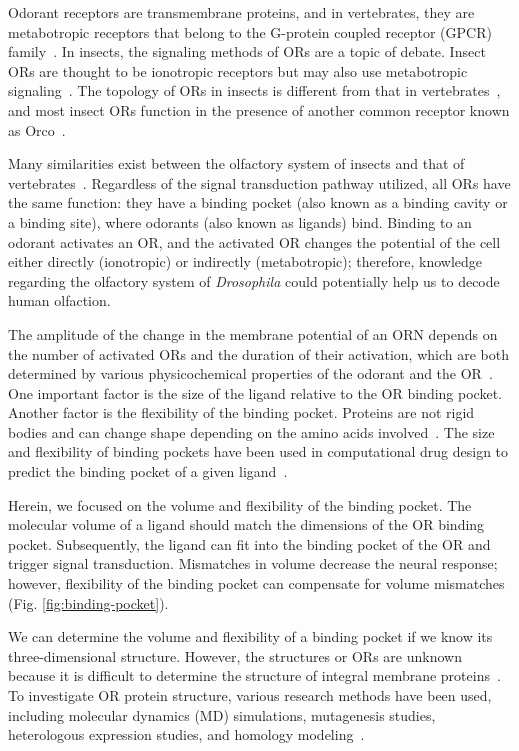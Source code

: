 \documentclass[fleqn,11pt]{wlscirep}
\begin{document}
Odorant receptors are transmembrane proteins, and 
in vertebrates, they are metabotropic receptors 
that belong to the G-protein coupled receptor (GPCR) family~\cite{Buck1991,niimura2009evolutionary}. 
In insects, the signaling methods of ORs are a topic of debate. 
Insect ORs are thought to be ionotropic receptors but may also use metabotropic signaling~\cite{Sato2008,Wicher2008,Nagel2011,Rong2011,yao2010}.
The topology of ORs in insects is different from that in vertebrates~\cite{Benton2006,Smart2008},
and most insect ORs function in the presence of another common receptor known as Orco~\cite{Larsson2004}.

Many similarities exist between the olfactory system of insects and that of vertebrates~\cite{Wilson2014,Kaupp2010}.
Regardless of the signal transduction pathway utilized, 
all ORs have the same function: they have a binding pocket (also known as a binding cavity or a binding site), 
where odorants (also known as ligands) bind. 
Binding to an odorant activates an OR, and 
the activated OR changes the potential of the cell either 
directly (ionotropic) or indirectly (metabotropic);
therefore, knowledge regarding the olfactory system of \textit{Drosophila} could potentially help us to decode human olfaction. 

The amplitude of the change in the membrane potential of an ORN depends on the number of activated ORs and the duration of their activation,
which are both determined by various physicochemical properties of the odorant and the OR~\cite{Turin,Araneda2000,Gabler2013,guerrieri2005,uchida2000}.
One important factor is the size of the ligand relative to the OR binding pocket. 
Another factor is the flexibility of the binding pocket. 
Proteins are not rigid bodies and can change shape 
depending on the amino acids involved~\cite{Ramachandran,apostolakis1998docking,gunasekaran2007different}.
The size and flexibility of binding pockets have been used in computational drug design to predict the binding pocket of a given ligand~\cite{liang1998anatomy}. 

Herein, we focused on the volume and flexibility of the binding pocket.
The molecular volume of a ligand should match the dimensions of the OR binding pocket. Subsequently, 
the ligand can fit into the binding pocket of the OR and trigger signal transduction. 
Mismatches in volume decrease the neural response; however, 
flexibility of the binding pocket can compensate for volume mismatches (Fig. \ref{fig:binding-pocket}).

We can determine the volume and flexibility of a binding pocket 
if we know its three-dimensional structure. 
However, the structures or ORs are unknown 
because it is difficult to determine the structure of integral membrane proteins~\cite{Zhang2008,Lupieri2009}.
To investigate OR protein structure, various research methods have been used, including molecular dynamics (MD) simulations, 
mutagenesis studies, heterologous expression studies, and homology modeling~\cite{Khafizov2007,Man2004,Lai2005,Vaidehi2002,Floriano2004,Schmiedeberg2007,Katada2005,Kato2008,Rospars2013}.
\end{document}
